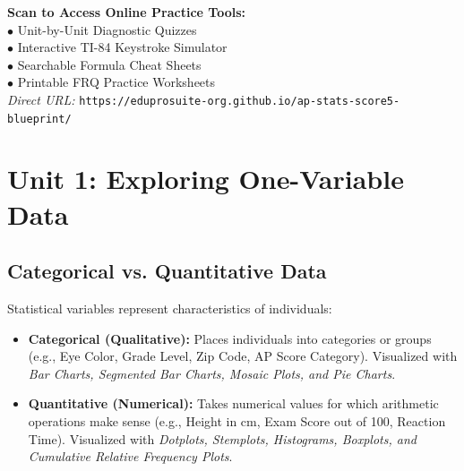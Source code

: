 ﻿\documentclass[11pt,oneside,openany]{book}
\begin{document}
\begin{center}
\begin{tcolorbox}[width=0.95\linewidth,colback=NavyBlue!5!white,colframe=NavyBlue,title=\textbf{FREE DIGITAL WEB COMPANION PORTAL}]
\begin{minipage}{0.65\linewidth}
  \textbf{Scan to Access Online Practice Tools:}\\
  $\bullet$ Unit-by-Unit Diagnostic Quizzes\\
  $\bullet$ Interactive TI-84 Keystroke Simulator\\
  $\bullet$ Searchable Formula Cheat Sheets\\
  $\bullet$ Printable FRQ Practice Worksheets\\[4pt]
  \textit{Direct URL:} \texttt{https://eduprosuite-org.github.io/ap-stats-score5-blueprint/}
\end{minipage}
\hfill
\begin{minipage}{0.30\linewidth}
  \centering
\end{minipage}
\end{tcolorbox}
\end{center}

\mainmatter

\chapter{Unit 1: Exploring One-Variable Data}

\section{Categorical vs. Quantitative Data}
\begin{lessonbox}
Statistical variables represent characteristics of individuals:
\begin{itemize}[leftmargin=1.2em]
  \item \textbf{Categorical (Qualitative):} Places individuals into categories or groups (e.g., Eye Color, Grade Level, Zip Code, AP Score Category). Visualized with \textit{Bar Charts, Segmented Bar Charts, Mosaic Plots, and Pie Charts}.
  \item \textbf{Quantitative (Numerical):} Takes numerical values for which arithmetic operations make sense (e.g., Height in cm, Exam Score out of 100, Reaction Time). Visualized with \textit{Dotplots, Stemplots, Histograms, Boxplots, and Cumulative Relative Frequency Plots}.
\end{itemize}
\end{lessonbox}
\end{document}
